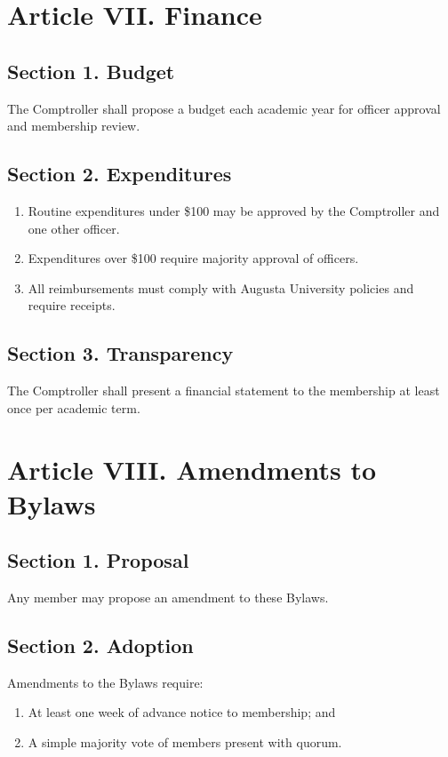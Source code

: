 \documentclass[12pt]{article}
\newcommand{\university}{Augusta University}
\begin{document}
\section*{Article VII. Finance}
\subsection*{Section 1. Budget}
The Comptroller shall propose a budget each academic year for officer approval and membership review.

\subsection*{Section 2. Expenditures}
\begin{enumerate}[label=\alph*)]
    \item Routine expenditures under \$100 may be approved by the Comptroller and one other officer.
    \item Expenditures over \$100 require majority approval of officers.
    \item All reimbursements must comply with \university{} policies and require receipts.
\end{enumerate}

\subsection*{Section 3. Transparency}
The Comptroller shall present a financial statement to the membership at least once per academic term.

\section*{Article VIII. Amendments to Bylaws}
\subsection*{Section 1. Proposal}
Any member may propose an amendment to these Bylaws.

\subsection*{Section 2. Adoption}
Amendments to the Bylaws require:
\begin{enumerate}[label=\alph*)]
    \item At least one week of advance notice to membership; and
    \item A simple majority vote of members present with quorum.
\end{enumerate}
\end{document}
